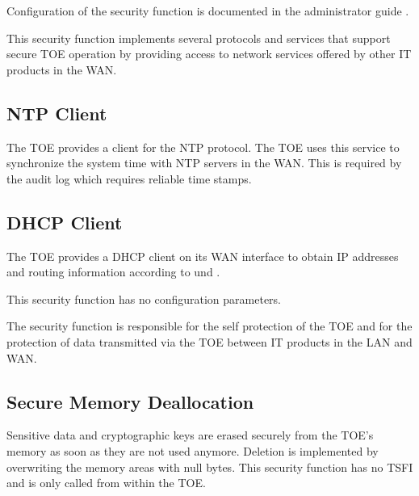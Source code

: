 

Configuration of the security function is documented in the administrator guide
\autocite[Section~7]{agd_adm}.

\sfdescription{}

This security function implements several protocols and services that support
secure TOE operation by providing access to network services offered by other IT
products in the WAN.

\hypertarget{sf.networkservices.ntp}{\subsection{NTP Client}\label{sf.networkservices.ntp}}

The TOE provides a client for the NTP protocol. The TOE uses this service to
synchronize the system time with NTP servers in the WAN. This is required by the
audit log which requires reliable time stamps.


\subsection{DHCP Client}\label{sf.networkservices.dhcpclient}

The TOE provides a DHCP client on its WAN interface \lswandhcp{} to obtain IP
addresses and routing information according to  und .




This security function has no configuration parameters.

\sfdescription{}

The security function is responsible for the self protection of the TOE and for
the protection of data transmitted via the TOE between IT products in the LAN
and WAN.

\subsection{Secure Memory Deallocation}\label{sf.selfprotection.rip}

Sensitive data and cryptographic keys are erased securely from the TOE's memory
as soon as they are not used anymore. Deletion is implemented by overwriting the
memory areas with null bytes. This security function has no TSFI and is only
called from within the TOE.

